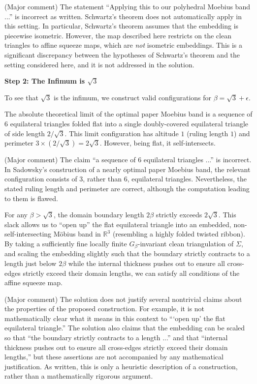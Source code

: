 \documentclass[12pt]{article}
\newcommand{\review}[1]{\begin{reviewbox}#1\end{reviewbox}}
\begin{document}
\review{(Major comment) The statement ``Applying this to our polyhedral Moebius band ...'' is incorrect as written. Schwartz's theorem does not automatically apply in this setting. In particular, Schwartz's theorem assumes that the embedding is piecewise isometric. However, the map described here restricts on the clean triangles to affine squeeze maps, which are \emph{not} isometric embeddings. This is a significant discrepancy between the hypotheses of Schwartz's theorem and the setting considered here, and it is not addressed in the solution.}

\vspace{1em}

\noindent\textbf{Step 2: The Infimum is $\sqrt{3}$}

\vspace{0.5em}

To see that $\sqrt{3}$ is the infimum, we construct valid configurations for $\beta = \sqrt{3} + \epsilon$.

The absolute theoretical limit of the optimal paper Moebius band is a sequence of $6$ equilateral triangles folded flat into a single doubly-covered equilateral triangle of side length $2/\sqrt{3}$. This limit configuration has altitude $1$ (ruling length $1$) and perimeter $3 \times (2/\sqrt{3}) = 2\sqrt{3}$. However, being flat, it self-intersects.

\review{(Major comment) The claim ``a sequence of $6$ equilateral triangles ...'' is incorrect. In Sadowsky's construction of a nearly optimal paper Moebius band, the relevant configuration consists of $3$, rather than $6$, equilateral triangles. Nevertheless, the stated ruling length and perimeter are correct, although the computation leading to them is flawed.}

For any $\beta > \sqrt{3}$, the domain boundary length $2\beta$ strictly exceeds $2\sqrt{3}$. This slack allows us to ``open up'' the flat equilateral triangle into an embedded, non-self-intersecting M\"obius band in $\mathbb{R}^3$ (resembling a highly folded twisted ribbon). By taking a sufficiently fine locally finite $G_{\beta}$-invariant clean triangulation of $\Sigma$, and scaling the embedding slightly such that the boundary strictly contracts to a length just below $2\beta$ while the internal thickness pushes out to ensure all cross-edges strictly exceed their domain lengths, we can satisfy all conditions of the affine squeeze map. 

\review{(Major comment) The solution does not justify several nontrivial claims about the properties of the proposed construction. For example, it is not mathematically clear what it means in this context to ```open up' the flat equilateral triangle.'' The solution also claims that the embedding can be scaled so that ``the boundary strictly contracts to a length ...'' and that ``internal thickness pushes out to ensure all cross-edges strictly exceed their domain lengths,'' but these assertions are not accompanied by any mathematical justification. As written, this is only a heuristic description of a construction, rather than a mathematically rigorous argument.}
\end{document}
